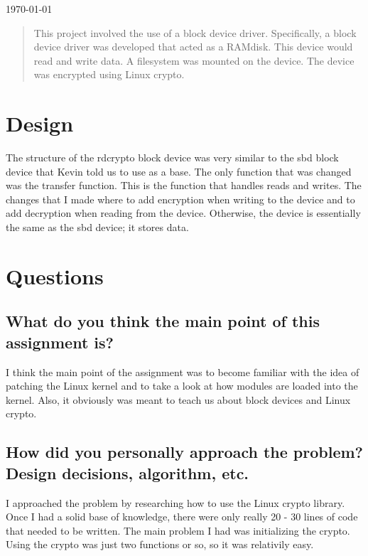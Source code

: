 \documentclass[journal,letterpaper,draftclsnofoot,onecolumn,10pt]{IEEEtran}
\begin{document}
\begin{titlepage}

{\large \today}\\[3cm] %

\begin{abstract}
This project involved the use of a block device driver. Specifically, a block device driver was developed that acted as a RAMdisk. This device would read and write data. A filesystem was mounted on the device. The device was encrypted using Linux crypto.
\end{abstract}

\vfill %

\pagebreak

\end{titlepage}

\section{Design}
The structure of the rdcrypto block device was very similar to the sbd block device that Kevin told us to use as a base. The only function that was changed was the transfer function. This is the function that handles reads and writes. The changes that I made where to add encryption when writing to the device and to add decryption when reading from the device. Otherwise, the device is essentially the same as the sbd device; it stores data.
\section{Questions}
\subsection{What do you think the main point of this assignment is?}
I think the main point of the assignment was to become familiar with the idea of patching the Linux kernel and to take a look at how modules are loaded into the kernel. Also, it obviously was meant to teach us about block devices and Linux crypto.
\subsection{How did you personally approach the problem? Design decisions, algorithm, etc.}
I approached the problem by researching how to use the Linux crypto library. Once I had a solid base of knowledge, there were only really 20 - 30 lines of code that needed to be written. The main problem I had was initializing the crypto. Using the crypto was just two functions or so, so it was relativily easy.
\end{document}
